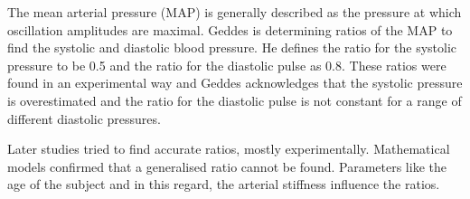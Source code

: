 The mean arterial pressure (MAP) is generally described as the pressure at which oscillation amplitudes are maximal. Geddes is determining ratios of the MAP to find the systolic and diastolic blood pressure. He defines the ratio for the systolic pressure to be 0.5 and the ratio for the diastolic pulse as 0.8. These ratios were found in an experimental way and Geddes acknowledges that the systolic pressure is overestimated and the ratio for the diastolic pulse is not constant for a range of different diastolic pressures.

Later studies tried to find accurate ratios, mostly experimentally. Mathematical models confirmed that a generalised ratio cannot be found. Parameters like the age of the subject and in this regard, the arterial stiffness influence the ratios. \cite{Babbs2012}
